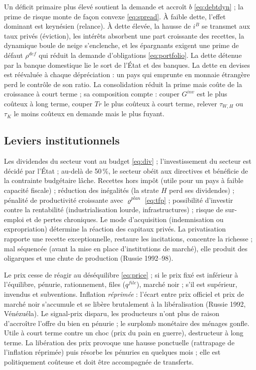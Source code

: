 \documentclass[11pt,a4paper]{article}
\begin{document}
\direct Un déficit primaire plus élevé soutient la demande et accroît $b$ \eqref{eq:debtdyn} ; la prime de risque monte de façon convexe \eqref{eq:spread}.
\second À faible dette, l'effet dominant est keynésien (relance). À dette élevée, la hausse de $i^B$ se transmet aux taux privés (éviction), les intérêts absorbent une part croissante des recettes, la dynamique boule de neige s'enclenche, et les épargnants exigent une prime de défaut $\rho^{def}$ qui réduit la demande d'obligations \eqref{eq:portfolio}. La dette détenue par la banque domestique lie le sort de l'État et des banques. La dette en devises est réévaluée à chaque dépréciation : un pays qui emprunte en monnaie étrangère perd le contrôle de son ratio.
\baisse La consolidation réduit la prime mais coûte de la croissance à court terme ; sa composition compte : couper $G^{inv}$ est le plus coûteux à long terme, couper $Tr$ le plus coûteux à court terme, relever $\tau_{W,H}$ ou $\tau_K$ le moins coûteux en demande mais le plus fuyant.

\subsection{Leviers institutionnels}

\direct Les dividendes du secteur vont au budget \eqref{eq:div} ; l'investissement du secteur est décidé par l'État ; au-delà de 50\,\%, le secteur obéit aux directives et bénéficie de la contrainte budgétaire lâche.
\second Recettes hors impôt (utile pour un pays à faible capacité fiscale) ; réduction des inégalités (la strate $H$ perd ses dividendes) ; pénalité de productivité croissante avec $\varrho^{plan}$ \eqref{eq:tfp} ; possibilité d'investir contre la rentabilité (industrialisation lourde, infrastructures) ; risque de sur-emploi et de pertes chroniques. Le mode d'acquisition (indemnisation ou expropriation) détermine la réaction des capitaux privés.
\baisse La privatisation rapporte une recette exceptionnelle, restaure les incitations, concentre la richesse ; mal séquencée (avant la mise en place d'institutions de marché), elle produit des oligarques et une chute de production (Russie 1992--98).

\direct Le prix cesse de réagir au déséquilibre \eqref{eq:price} ; si le prix fixé est inférieur à l'équilibre, pénurie, rationnement, files ($q^{file}$), marché noir ; s'il est supérieur, invendus et subventions.
\second Inflation \emph{réprimée} : l'écart entre prix officiel et prix de marché noir s'accumule et se libère brutalement à la libéralisation (Russie 1992, Vénézuéla). Le signal-prix disparu, les producteurs n'ont plus de raison d'accroître l'offre du bien en pénurie ; le surplomb monétaire des ménages gonfle. Utile à court terme contre un choc (prix du pain en guerre), destructeur à long terme.
\baisse La libération des prix provoque une hausse ponctuelle (rattrapage de l'inflation réprimée) puis résorbe les pénuries en quelques mois ; elle est politiquement coûteuse et doit être accompagnée de transferts.
\end{document}
